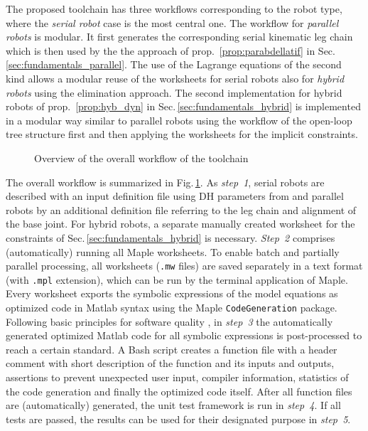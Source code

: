 \documentclass[runningheads]{llncs}
\begin{document}
The proposed toolchain has three workflows corresponding to the robot type, where the \emph{serial robot} case is the most central one.
The workflow for \emph{parallel robots} is modular.
It first generates the corresponding serial kinematic leg chain which is then used by the the approach of prop.~\ref{prop:parabdellatif} in Sec.\,\ref{sec:fundamentals_parallel}.
The use of the Lagrange equations of the second kind allows a modular reuse of the worksheets for serial robots also for \emph{hybrid robots} using the elimination approach.
The second implementation for hybrid robots of prop.~\ref{prop:hyb_dyn} in Sec.\,\ref{sec:fundamentals_hybrid} is implemented in a modular way similar to parallel robots using the workflow of the open-loop tree structure first and then applying the worksheets for the implicit constraints.

\begin{figure}[b]
\vspace{-0.2cm} %

\vspace{-0.2cm}
\caption{Overview of the overall workflow of the toolchain}
\label{fig:toolbox_workflow}
\end{figure}

The overall workflow is summarized in Fig.\,\ref{fig:toolbox_workflow}.
As \emph{step~1}, serial robots are described with an input definition file using DH parameters from \cite{KhalilDom2002} and parallel robots by an additional definition file referring to the leg chain and alignment of the base joint.
For hybrid robots, a separate manually created worksheet for the constraints of Sec.\,\ref{sec:fundamentals_hybrid} is necessary.
\emph{Step~2} comprises (automatically) running all Maple worksheets.
To enable batch and partially parallel processing, all worksheets (\texttt{.mw} files) are saved separately in a text format (with \texttt{.mpl} extension), which can be run by the terminal application of Maple.
Every worksheet exports the symbolic expressions of the model equations as optimized code in Matlab syntax using the Maple \texttt{CodeGeneration} package.
Following basic principles for software quality \cite{WilsonAruBroHon2014}, in \emph{step~3} the automatically generated optimized Matlab code for all symbolic expressions is post-processed to reach a certain standard.
A Bash script creates a function file with a header comment with short description of the function and its inputs and outputs, assertions to prevent unexpected user input, compiler information,
statistics of the code generation and finally the optimized code itself.
After all function files are (automatically) generated, the unit test framework is run in \emph{step~4}.
If all tests are passed, the results can be used for their designated purpose in \emph{step~5}.
\end{document}
